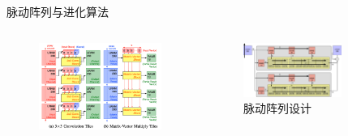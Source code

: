 \documentclass[10pt]{beamer}
\begin{document}
\begin{frame}{脉动阵列与进化算法}

  \begin{columns}[T, onlytextwidth]
  
    \begin{figure}
      \includegraphics[width=\textwidth]{img/cascade.png}
      \vspace{-0.5cm}
    \end{figure}

    \begin{figure}
      \includegraphics[width=0.8\textwidth]{img/array}
      \caption{脉动阵列设计}
    \end{figure}
  
    \vspace{-0.2cm}
    \begin{center}
    \end{center}


\end{columns}
\end{frame}
\end{document}
